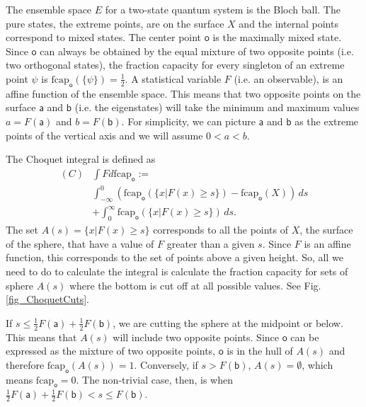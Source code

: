 \documentclass[10pt,twocolumn, nofootinbib]{revtex4-2}
\newcommand\frcap{\mathrm{fcap}}
\newcommand{\ens}[1][e] {\mathsf{#1}} %
\begin{document}
The ensemble space $E$ for a two-state quantum system is the Bloch ball. The pure states, the extreme points, are on the surface $X$ and the internal points correspond to mixed states. The center point $\ens[o]$ is the maximally mixed state. Since $\ens[o]$ can always be obtained by the equal mixture of two opposite points (i.e. two orthogonal states), the fraction capacity for every singleton of an extreme point $\psi$ is $\frcap_{\ens[o]}(\{\psi\}) =\frac{1}{2}$. A statistical variable $F$ (i.e. an observable), is an affine function of the ensemble space. This means that two opposite points on the surface $\ens[a]$ and $\ens[b]$ (i.e. the eigenstates) will take the minimum and maximum values $a = F(\ens[a])$ and $b = F(\ens[b])$. For simplicity, we can picture $\ens[a]$ and $\ens[b]$ as the extreme points of the vertical axis and we will assume $0<a<b$.

The Choquet integral is defined as 
\begin{equation}
	\begin{aligned}
(C)&\int F d\frcap_{\ens[o]} := \\
&\int_{-\infty}^0
(\frcap_{\ens[o]} (\{x | F (x) \geq s\})-\frcap_{\ens[o]}(X))\, ds \\
&+
\int^\infty_0
\frcap_{\ens[o]} (\{x | F (x) \geq s\})\, ds.
	\end{aligned}
\end{equation}
The set $A(s) = \{x | F (x) \geq s\}$ corresponds to all the points of $X$, the surface of the sphere, that have a value of $F$ greater than a given $s$. Since $F$ is an affine function, this corresponds to the set of points above a given height. So, all we need to do to calculate the integral is calculate the fraction capacity for sets of sphere $A(s)$ where the bottom is cut off at all possible values. See Fig. \ref{fig_ChoquetCuts}.

If $s\leq \frac{1}{2} F(\ens[a]) + \frac{1}{2} F(\ens[b])$, we are cutting the sphere at the midpoint or below. This means that $A(s)$ will include two opposite points. Since $\ens[o]$ can be expressed as the mixture of two opposite points, $\ens[o]$ is in the hull of $A(s)$ and therefore $\frcap_{\ens[o]}(A(s)) = 1$. Conversely, if $s > F(\ens[b])$, $A(s) = \emptyset$, which means $\frcap_{\ens[o]} = 0$. The non-trivial case, then, is when $\frac{1}{2} F(\ens[a]) + \frac{1}{2} F(\ens[b]) < s \leq F(\ens[b])$.
\end{document}
